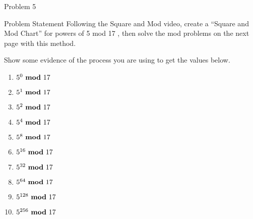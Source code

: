\begin{problem}{Problem 5}
    \begin{statement}{Problem Statement}
        Following the Square and Mod video, create a “Square and Mod Chart” for powers of 5 mod 17 , then solve the mod problems on the next page with this method.

        Show some evidence of the process you are using to get the values below.

        \begin{enumerate}[label = (\alph*)]
            \item $5^{0} \text{ \textbf{mod} } 17$
            \item $5^{1} \text{ \textbf{mod} } 17$
            \item $5^{2} \text{ \textbf{mod} } 17$
            \item $5^{4} \text{ \textbf{mod} } 17$
            \item $5^{8} \text{ \textbf{mod} } 17$
            \item $5^{16} \text{ \textbf{mod} } 17$
            \item $5^{32} \text{ \textbf{mod} } 17$
            \item $5^{64} \text{ \textbf{mod} } 17$
            \item $5^{128} \text{ \textbf{mod} } 17$
            \item $5^{256} \text{ \textbf{mod} } 17$
        \end{enumerate}
    \end{statement}


\end{problem}
